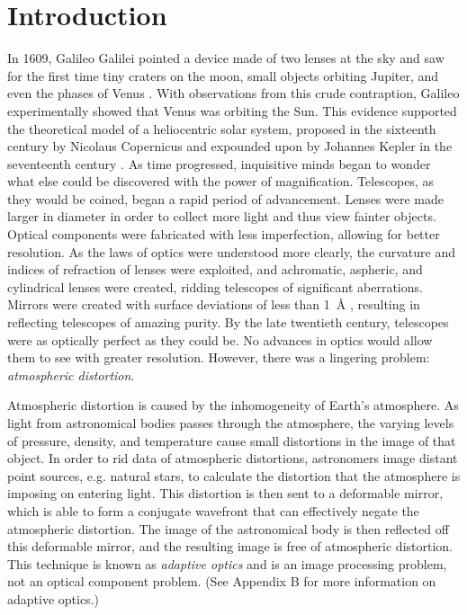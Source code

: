 


\chapter{Introduction}
In 1609, Galileo Galilei pointed a device made of two lenses at the sky and saw for the first time tiny craters on the moon, small objects orbiting Jupiter, and even the phases of Venus \cite{nasa,keckhistory}. With observations from this crude contraption, Galileo experimentally showed that Venus was orbiting the Sun. This evidence supported the theoretical model of a heliocentric solar system, proposed in the sixteenth century by Nicolaus Copernicus and expounded upon by Johannes Kepler in the seventeenth century \cite{copern}. As time progressed, inquisitive minds began to wonder what else could be discovered with the power of magnification. Telescopes, as they would be coined, began a rapid period of advancement. Lenses were made larger in diameter in order to collect more light and thus view fainter objects. Optical components were fabricated with less imperfection, allowing for better resolution. As the laws of optics were understood more clearly, the curvature and indices of refraction of lenses were exploited, and achromatic, aspheric, and cylindrical lenses were created, ridding telescopes of significant aberrations. Mirrors were created with surface deviations of less than \SI{1}{\angstrom} \cite{daewook}, resulting in reflecting telescopes of amazing purity. By the late twentieth century, telescopes were as optically perfect as they could be. No advances in optics would allow them to see with greater resolution. However, there was a lingering problem: \textit{atmospheric distortion}.

Atmospheric distortion is caused by the inhomogeneity of Earth's atmosphere. As light from astronomical bodies passes through the atmosphere, the varying levels of pressure, density, and temperature cause small distortions in the image of that object. In order to rid data of atmospheric distortions, astronomers image distant point sources, e.g. natural stars, to calculate the distortion that the atmosphere is imposing on entering light. This distortion is then sent to a deformable mirror, which is able to form a conjugate wavefront that can effectively negate the atmospheric distortion. The image of the astronomical body is then reflected off this deformable mirror, and the resulting image is free of atmospheric distortion. This technique is known as \textit{adaptive optics} and is an image processing problem, not an  optical component problem. (See Appendix B for more information on adaptive optics.)

